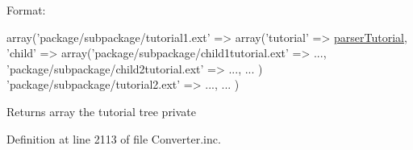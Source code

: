 \-Format\-: 
\begin{DoxyPre}
 array('package/subpackage/tutorial1.ext' =>
          array('tutorial' => \hyperlink{classparser_tutorial}{parserTutorial},
                'child'    =>
                    array('package/subpackage/child1tutorial.ext' => ...,
                          'package/subpackage/child2tutorial.ext' => ...,
                          ...
                         )
       'package/subpackage/tutorial2.ext' => ...,
       ...
       )
 \end{DoxyPre}
 \begin{DoxyReturn}{\-Returns}
array the tutorial tree  private 
\end{DoxyReturn}


\-Definition at line 2113 of file \-Converter.\-inc.


